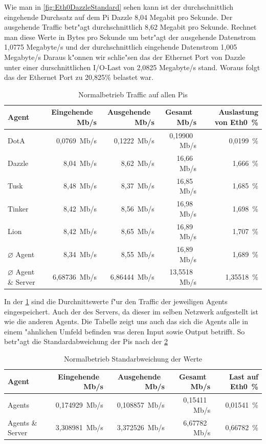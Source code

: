 Wie man in \cref{fig:Eth0DazzleStandard} sehen kann ist der durchschnittlich eingehende Durchsatz auf dem Pi Dazzle 8,04 Megabit %
pro Sekunde. Der ausgehende Traffic betr"agt durchschnittlich 8,62 Megabit pro Sekunde. Rechnet man diese Werte in Bytes pro Sekunde um %
betr"agt der ausgehende Datenstrom 1,0775 Megabyte/s und der durchschnittlich eingehende Datenstrom 1,005 Megabyte/s %
Daraus k"onnen wir schlie"sen das der Ethernet Port von Dazzle unter einer durschnittlichen I/O-Last von 2,0825 Megabyte/s stand. %
Woraus folgt das der Ethernet Port zu 20,825\% belastet war.
\begin{table}
\centering
\begin{tabular}{l%
 r<{\,Mb/s}%
 r<{\,Mb/s}%
 r<{\,Mb/s}%
 r<{\,\%}%
}
Agent  				& Eingehende		& Ausgehende		& Gesamt		& Auslastung von Eth0	\\
\hline
DotA				& 0,0769		& 0,1222		& 0,19900		& 0,0199 		\\
Dazzle 				& 8,04 			& 8,62			& 16,66 		& 1,666			\\
Tusk 				& 8,48			& 8,37			& 16,85			& 1,685			\\
Tinker				& 8,42			& 8,56			& 16,98			& 1,698			\\
Lion				& 8,42			& 8,65			& 16,89			& 1,707			\\ 
$\diameter $ Agent 		& 8,34			& 8,55 			& 16,89			& 1,689 		\\   
$\diameter $ Agent \& Server 	& 6,68736		& 6,86444		& 13,5518		& 1,35518		\\

\end{tabular}
\caption{Normalbetrieb Traffic auf allen Pis}
\label{tab:standardTraffic}
\end{table}

In der \cref{tab:standardTraffic} sind die Durchnittswerte f"ur den Traffic der jeweiligen Agents eingespeichert. Auch der %
des Servers, da dieser im selben Netzwerk aufgestellt ist wie die anderen Agents. Die Tabelle zeigt uns auch %
das sich die Agents alle in einem "ahnlichen Umfeld befinden was deren Input sowie Output betrifft. So betr"agt die
Standardabweichung der Pis nach der \cref{tab:standardTrafficAbweichung}     

\begin{table}
\centering
\begin{tabular}{l%
 r<{\,Mb/s}%
 r<{\,Mb/s}%
 r<{\,Mb/s}%
 r<{\,\%}%
}
Agent		& Eingehende            & Ausgehende            & Gesamt                & Last auf Eth0 \\
\hline
Agents		& 0,174929              & 0,108857              & 0,15411               &  0,01541        \\
Agents \& Server& 3,308981		& 3,372526        	& 6,67782             	&  0,66782         \\
\end{tabular}
\caption{Normalbetrieb Standarbweichung der Werte}
\label{tab:standardTrafficAbweichung}
\end{table}


